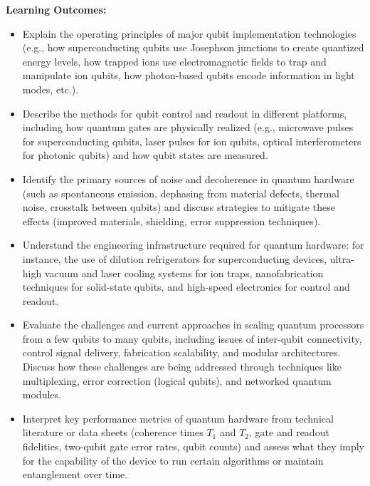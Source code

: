 \documentclass{scrreprt}
\begin{document}
\textbf{Learning Outcomes:}
\begin{itemize}
\item Explain the operating principles of major qubit implementation technologies (e.g., how superconducting qubits use Josephson junctions to create quantized energy levels, how trapped ions use electromagnetic fields to trap and manipulate ion qubits, how photon-based qubits encode information in light modes, etc.).
\item Describe the methods for qubit control and readout in different platforms, including how quantum gates are physically realized (e.g., microwave pulses for superconducting qubits, laser pulses for ion qubits, optical interferometers for photonic qubits) and how qubit states are measured.
\item Identify the primary sources of noise and decoherence in quantum hardware (such as spontaneous emission, dephasing from material defects, thermal noise, crosstalk between qubits) and discuss strategies to mitigate these effects (improved materials, shielding, error suppression techniques).
\item Understand the engineering infrastructure required for quantum hardware: for instance, the use of dilution refrigerators for superconducting devices, ultra-high vacuum and laser cooling systems for ion traps, nanofabrication techniques for solid-state qubits, and high-speed electronics for control and readout.
\item Evaluate the challenges and current approaches in scaling quantum processors from a few qubits to many qubits, including issues of inter-qubit connectivity, control signal delivery, fabrication scalability, and modular architectures. Discuss how these challenges are being addressed through techniques like multiplexing, error correction (logical qubits), and networked quantum modules.
\item Interpret key performance metrics of quantum hardware from technical literature or data sheets (coherence times $T_1$ and $T_2$, gate and readout fidelities, two-qubit gate error rates, qubit counts) and assess what they imply for the capability of the device to run certain algorithms or maintain entanglement over time.
\end{itemize}
\end{document}
